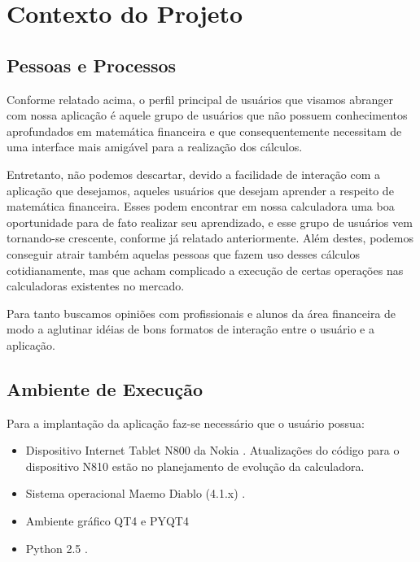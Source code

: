 \section{Contexto do Projeto}

\subsection{Pessoas e Processos}

Conforme relatado acima, o perfil principal de usuários que visamos abranger com nossa aplicação é aquele grupo de usuários que não possuem conhecimentos aprofundados em matemática financeira e que consequentemente necessitam de uma interface mais amigável para a realização dos cálculos.

Entretanto, não podemos descartar, devido a facilidade de interação com a aplicação que desejamos, aqueles usuários que desejam aprender a respeito de matemática financeira. Esses podem encontrar em nossa calculadora uma boa oportunidade para de fato realizar seu aprendizado, e esse grupo de usuários vem tornando-se crescente, conforme já relatado anteriormente. Além destes, podemos conseguir atrair também aquelas pessoas que fazem uso desses cálculos cotidianamente, mas que acham complicado a execução de certas operações nas calculadoras existentes no mercado.

Para tanto buscamos opiniões com profissionais e alunos da área financeira de modo a aglutinar idéias de bons formatos de interação entre o usuário e a aplicação.


\subsection{Ambiente de Execução}


Para a implantação da aplicação faz-se necessário que o usuário possua:

\begin{itemize}
 \item Dispositivo Internet Tablet N800 da Nokia \cite{n800}. Atualizações do código para o dispositivo N810 estão no planejamento de evolução da calculadora.
 \item Sistema operacional Maemo Diablo (4.1.x) \cite{diablo}.
 \item Ambiente gráfico QT4 \cite{qt4} e PYQT4 \cite{pyqt4}
 \item Python 2.5 \cite{python}.
\end{itemize}

